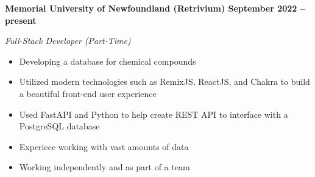 \vspace{0.1cm}
\textbf{Memorial University of Newfoundland (Retrivium) \hfill September 2022 -- present} \par
\textit{Full-Stack Developer (Part-Time)} \par
\begin{itemize}
    \item Developing a database for chemical compounds
    \item Utilized modern technologies such as RemixJS, ReactJS, and Chakra to build a beautiful front-end user experience
    \item Used FastAPI and Python to help create REST API to interface with a PostgreSQL database
	\item Experiece working with vast amounts of data
    \item Working independently and as part of a team
\end{itemize} \par